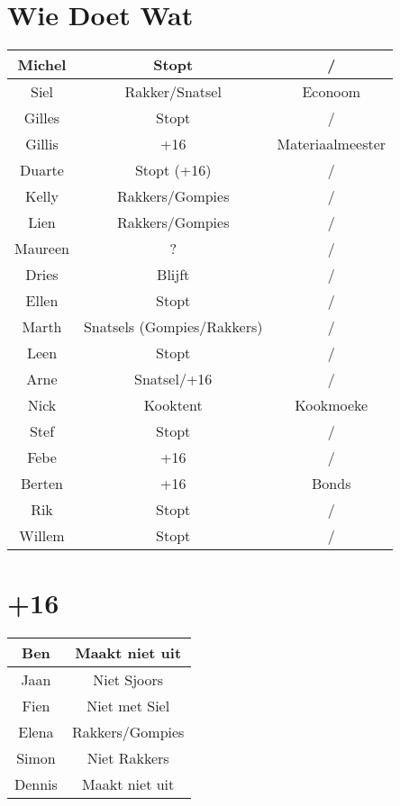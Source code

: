 \documentclass[pdftex,12pt,a4paper,english,titlepage]{article}
\begin{document}
\section{Wie Doet Wat}
\begin{tabular}{| c | c | c |}
	\hline			
	Michel & Stopt & / \\ \hline
	Siel & Rakker/Snatsel & Econoom \\ \hline
	Gilles & Stopt & / \\ \hline
	Gillis & +16 & Materiaalmeester \\ \hline
	Duarte & Stopt (+16) & / \\ \hline
	Kelly & Rakkers/Gompies & / \\ \hline
	Lien & Rakkers/Gompies & / \\ \hline
	Maureen & ? & / \\ \hline
	Dries & Blijft & / \\ \hline
	Ellen & Stopt & / \\ \hline
	Marth & Snatsels (Gompies/Rakkers) & / \\ \hline
	Leen & Stopt & / \\ \hline
	Arne & Snatsel/+16 & / \\ \hline
	Nick & Kooktent & Kookmoeke \\ \hline
	Stef & Stopt & / \\ \hline
	Febe & +16 & / \\ \hline
	Berten & +16 & Bonds \\ \hline
	Rik & Stopt & / \\ \hline
	Willem & Stopt & / \\ \hline 
\end{tabular}

\section{+16}

\begin{tabular}{| c | c |}
	Ben & Maakt niet uit \\ \hline
	Jaan & Niet Sjoors \\ \hline
	Fien & Niet met Siel \\ \hline
	Elena & Rakkers/Gompies  \\ \hline
	Simon & Niet Rakkers \\ \hline
	Dennis & Maakt niet uit \\ \hline
\end{tabular}
\end{document}
